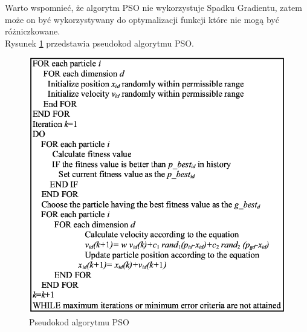 Warto wspomnieć, że algorytm PSO nie wykorzystuje Spadku Gradientu, zatem może on być wykorzystywany do optymalizacji funkcji które nie mogą być różniczkowane. \\
Rysunek \ref{PsoPseudocode} przedstawia pseudokod algorytmu PSO.
\vspace{0.5cm}
\begin{figure}[H]
\centering
\includegraphics[width=13.5cm]{resources/figures/pso_pseudocode.png}
\caption{Pseudokod algorytmu PSO}
\label{PsoPseudocode}
\end{figure}

